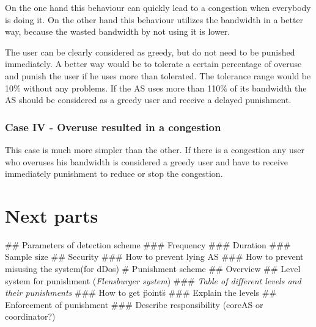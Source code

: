\documentclass[thesis.tex]{subfiles}
\begin{document}
On the one hand this behaviour can quickly lead to a congestion when everybody is doing it. On the other hand this behaviour utilizes the bandwidth in a better way, because the wasted bandwidth by not using it is lower.

The user can be clearly considered as greedy, but do not need to be punished immediately. A better way would be to tolerate a certain percentage of overuse and punish the user if he uses more than tolerated. The tolerance range would be 10\% without any problems. If the AS uses more than 110\% of its bandwidth the AS should be considered as a greedy user and receive a delayed punishment.


\subsubsection{Case IV - Overuse resulted in a congestion}
This case is much more simpler than the other. If there is a congestion any user who overuses his bandwidth is considered a greedy user and have to receive immediately punishment to reduce or stop the congestion. 

\section{Next parts}
\begin{easylist}
    \MyListProperties
        ## Parameters of detection scheme
        ### Frequency
        ### Duration
        ### Sample size
        ## Security
        ### How to prevent lying AS
        ### How to prevent misusing the system(for dDos)
        # Punishment scheme
        ## Overview
        ## Level system for punishment (\textit{Flensburger system})
        ### \textit{Table of different levels and their punishments}
        ### How to get \"points\"
        ### Explain the levels
        ## Enforcement of punishment
        ### Describe responsibility (coreAS or coordinator?)
    \end{easylist}
\subfilebib %
\end{document}

